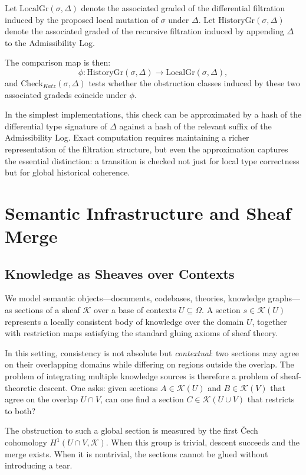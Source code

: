 \documentclass[12pt]{article}
\begin{document}
Let $\mathrm{LocalGr}(\sigma, \Delta)$ denote the associated graded of the
differential filtration induced by the proposed local mutation of $\sigma$ under
$\Delta$. Let $\mathrm{HistoryGr}(\sigma, \Delta)$ denote the associated graded of the
recursive filtration induced by appending $\Delta$ to the Admissibility Log.

The comparison map is then:
\[
\phi : \mathrm{HistoryGr}(\sigma,\Delta) \to \mathrm{LocalGr}(\sigma,\Delta),
\]
and $\mathrm{Check}_{Katz}(\sigma,\Delta)$ tests whether the obstruction classes
induced by these two associated gradeds coincide under $\phi$.

In the simplest implementations, this check can be approximated by a hash of the
differential type signature of $\Delta$ against a hash of the relevant suffix of the
Admissibility Log. Exact computation requires maintaining a richer representation of
the filtration structure, but even the approximation captures the essential
distinction: a transition is checked not just for local type correctness but for
global historical coherence.

\section{Semantic Infrastructure and Sheaf Merge}

\subsection{Knowledge as Sheaves over Contexts}

We model semantic objects---documents, codebases, theories, knowledge graphs---as
sections of a sheaf $\mathcal{K}$ over a base of contexts $U \subseteq \Omega$. A
section $s \in \mathcal{K}(U)$ represents a locally consistent body of knowledge over
the domain $U$, together with restriction maps satisfying the standard gluing axioms
of sheaf theory.

In this setting, consistency is not absolute but \emph{contextual}: two sections may
agree on their overlapping domains while differing on regions outside the overlap.
The problem of integrating multiple knowledge sources is therefore a problem of
sheaf-theoretic descent. One asks: given sections $A \in \mathcal{K}(U)$ and
$B \in \mathcal{K}(V)$ that agree on the overlap $U \cap V$, can one find a section
$C \in \mathcal{K}(U \cup V)$ that restricts to both?

The obstruction to such a global section is measured by the first \v{C}ech cohomology
$H^1(U \cap V, \mathcal{K})$. When this group is trivial, descent succeeds and the
merge exists. When it is nontrivial, the sections cannot be glued without
introducing a tear.
\end{document}
